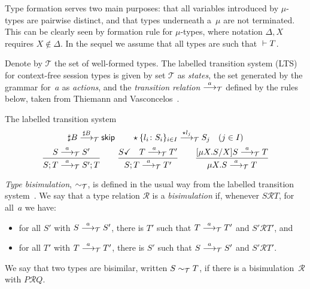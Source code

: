 Type formation serves two main purposes: that all variables introduced
by $\mu$-types are pairwise distinct, and that types underneath
a~$\mu$ are not terminated. This can be clearly seen by formation rule
for $\mu$-types, where notation $\Delta,X$ requires $X\notin\Delta$.
%
In the sequel we assume that all types are such that $\isType[] T$.

Denote by $\mathcal{T}$ the set of well-formed types.
%
The labelled transition system (LTS) for context-free session types is
given by set $\mathcal{T}$ as \emph{states}, the set generated by the
grammar for~$a$ as \emph{actions}, and the \emph{transition relation}
$\LTSderives$ defined by the rules below, taken from Thiemann and
Vasconcelos~\cite{thiemann2016context}.

\noindent The labelled transition system\hfill{}
%
\begin{gather*}
  \sharp B \LTSderives[\sharp B] \skipk
  \qquad
  \star\{l_i\colon S_i\}_{i\in I} \LTSderives[\star l_j] S_j\quad
  (j\in I)
  \\
  \frac{S \LTSderives S'}{S; T \LTSderives S';T}
  \qquad
  \frac{\DONE{S} \quad T \LTSderives T'}{S; T \LTSderives T'}
  \qquad
  \frac{\subs{\mu X.S}{X}S \LTSderives T}{\mu X.S \LTSderives T}
\end{gather*}

\emph{Type bisimulation}, $\TypeEquiv$, is defined in the usual way from the
labelled transition system~\cite{sangiorgi2014introduction}.
%
We say that a type relation $\mathcal R$ is a \emph{bisimulation} if,
whenever $S\mathcal RT$, for all~$a$ we have:
%
\begin{itemize}
\item for all $S'$ with $S \LTSderives S'$, there is $T'$ such that $T
  \LTSderives T'$ and $S'\mathcal RT'$, and
\item for all $T'$ with $T \LTSderives T'$, there is $S'$ such that $S
  \LTSderives S'$ and $S'\mathcal RT'$.
\end{itemize}
%
We say that two types are bisimilar, written $S \bisim T$, if there
is a bisimulation~$\mathcal R$ with $P\mathcal RQ$.

